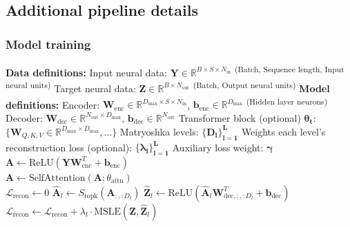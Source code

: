 \subsection{Additional pipeline details}
\label{subsection:additional_pipeline_details}

\subsubsection{Model training}
\label{subsubsection:model_training_details}

\begin{algorithm}[h]
\caption{Model training procedure}
\label{algorithm:sed_model_training}
\begin{algorithmic}[1]
\State \textbf{Data definitions:}
\State \quad Input neural data: $\mathbf{Y} \in \mathbb{R}^{B \times S \times N_{\text{in}}}$ \textsuperscript{(Batch, Sequence length, Input neural units)}
\State \quad Target neural data: $\mathbf{Z} \in \mathbb{R}^{B \times N_{\text{out}}}$ \textsuperscript{(Batch, Output neural units)}
\State \textbf{Model definitions:}
\State \quad Encoder: $\mathbf{W}_{\text{enc}} \in \mathbb{R}^{D_{\text{max}} \times S \times N_{\text{in}}}$, $\mathbf{b}_{\text{enc}} \in \mathbb{R}^{D_{\text{max}}}$ \textsuperscript{(Hidden layer neurons)}
\State \quad Decoder: $\mathbf{W}_{\text{dec}} \in \mathbb{R}^{N_{\text{out}} \times D_{\text{max}}}$, $\mathbf{b}_{\text{dec}} \in \mathbb{R}^{N_{\text{out}}}$
\State \quad Transformer block (optional) $\mathbf{\theta_{t}}$: $\{\mathbf{W}_{Q,K,V} \in \mathbb{R}^{D_{\max} \times D_{\max}}, \dots\}$
\State \quad Matryoshka levels: $\mathbf{\{D_l\}_{l=1}^L}$
\State \quad Weights each level's reconstruction loss (optional): $\mathbf{\{\lambda_l\}_{l=1}^L}$
\State \quad Auxiliary loss weight: $\mathbf{\gamma}$
\\
    \Statex {}
    \State $\mathbf{A} \gets \text{ReLU}(\mathbf{Y}\mathbf{W}_{\text{enc}}^T + \mathbf{b}_{\text{enc}})$ 
    \\
        \State $\mathbf{A} \gets \text{SelfAttention}(\mathbf{A}; \theta_{\text{attn}})$ 
    \EndIf
    \\
    \State $\mathcal{L}_{\text{recon}} \gets 0$
     
        \State $\hat{\mathbf{A}}_l \gets S_{\text{topk}}(\mathbf{A}_{:, :D_l})$ 
        \State $\hat{\mathbf{Z}}_l \gets \text{ReLU}(\hat{\mathbf{A}}_l \mathbf{W}_{\text{dec}, :, :D_l}^T + \mathbf{b}_{\text{dec}})$ 
        \State $\mathcal{L}_{\text{recon}} \gets \mathcal{L}_{\text{recon}} + \lambda_l \cdot \text{MSLE}(\mathbf{Z}, \hat{\mathbf{Z}}_l)$ 
    \EndFor
    

\end{algorithmic}
\end{algorithm}
